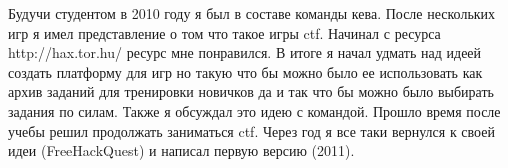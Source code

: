 
Будучи студентом в 2010 году я был в составе команды кева.
После нескольких игр я имел представление о том что такое игры ctf.
Начинал с ресурса http://hax.tor.hu/ ресурс мне понравился.
В итоге я начал удмать над идеей создать платформу для игр но такую что бы можно было
ее использовать как архив заданий для тренировки новичков да и так что бы можно было выбирать задания по силам.
Также я обсуждал это идею с командой. Прошло время после учебы решил продолжать заниматься ctf.
Через год я все таки вернулся к своей идеи (FreeHackQuest) и написал первую версию (2011).

